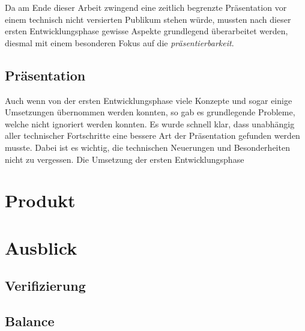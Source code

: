 \documentclass[11pt]{article}
\begin{document}
\noindent Da am Ende dieser Arbeit zwingend eine zeitlich begrenzte
Präsentation vor einem technisch nicht versierten Publikum stehen
würde, mussten nach dieser ersten Entwicklungsphase gewisse Aspekte
grundlegend überarbeitet werden, diesmal mit einem besonderen Fokus
auf die \emph{präsentierbarkeit}.  
\subsection{Präsentation}
\label{sec:org707f7fe}
Auch wenn von der ersten Entwicklungsphase viele Konzepte und sogar
einige Umsetzungen übernommen werden konnten, so gab es grundlegende
Probleme, welche nicht ignoriert werden konnten. Es wurde schnell
klar, dass unabhängig aller technischer Fortschritte eine bessere Art
der Präsentation gefunden werden musste. Dabei ist es wichtig, die
technischen Neuerungen und Besonderheiten nicht zu vergessen. Die
Umsetzung der ersten Entwicklungsphase 
\section{Produkt}
\label{sec:org8acb44c}
\section{Ausblick}
\label{sec:orge70a4e7}
\subsection{Verifizierung}
\label{sec:org2a7e766}
\subsection{Balance}
\label{sec:orgb1f7338}
\end{document}
